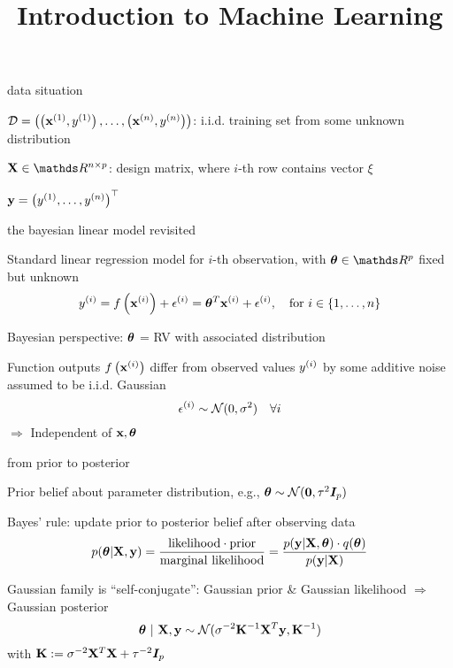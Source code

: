 \documentclass[11pt,compress,t,notes=noshow, xcolor=table]{beamer}
\title{Introduction to Machine Learning}
\begin{document}


\begin{framei}{data situation}
\item $\mathcal{D} = \left( \left(\mathbf{x}^{(1)}, y^{(1)}\right), \ldots, \left(\mathbf{x}^{(n)}, y^{(n)}\right)\right)$: i.i.d. training set from some unknown distribution
\item $\Xmat \in \R^{n \times p}$: design matrix, where $i$-th row contains vector $\xi$
\item $\mathbf{y} = \left(y^{(1)}, \hdots, y^{(n)}\right)^\top$
\end{framei}

\begin{framei}[sep=L]{the bayesian linear model revisited}
\item Standard linear regression model for $i$-th observation, with $\thetav \in \R^p$ fixed but unknown
$$y^{(i)} = f\left(\mathbf{x}^{(i)}\right) + \epsilon^{(i)} = \bm{\theta}^T \mathbf{x}^{(i)} + \epsilon^{(i)}, \quad \text{for } i \in \{1, \ldots, n\}$$
\item Bayesian perspective: $\bm{\theta}$ = RV with associated distribution
\item Function outputs $f\left(\mathbf{x}^{(i)}\right)$ differ from observed values $y^{(i)}$ by some additive noise assumed to be i.i.d. Gaussian
$$\epsilon^{(i)} \sim \mathcal{N}(0, \sigma^2) \quad \forall i$$ 
$\Rightarrow$ Independent of $\mathbf{x}, \bm{\theta}$
\end{framei}

\begin{framei}[sep=L]{from prior to posterior}
\item Prior belief about parameter distribution, e.g., $\bm{\theta} \sim \mathcal{N}(\mathbf{0}, \tau^2 \bm{I}_p)$
\item Bayes' rule: update prior to posterior belief after observing data
$$
p(\bm{\theta} | \mathbf{X}, \mathbf{y}) 
= \frac{\text{likelihood} \cdot \text{prior}}{\text{marginal likelihood}} 
= \frac{p(\mathbf{y} | \mathbf{X}, \bm{\theta}) \cdot q(\bm{\theta})}{p(\mathbf{y}|\mathbf{X})}
$$
\item Gaussian family is ``self-conjugate'': Gaussian prior \& Gaussian likelihood $\Rightarrow$ Gaussian posterior 
$$
\bm{\theta} ~|~ \mathbf{X}, \mathbf{y} \sim \mathcal{N}(\sigma^{-2} \mathbf{K}^{-1}\mathbf{X}^T\mathbf{y}, \mathbf{K}^{-1})
$$
with $\mathbf{K}:= \sigma^{-2}\mathbf{X}^T\mathbf{X} + \tau^{-2} \bm{I}_p$
\end{framei}
\end{document}
